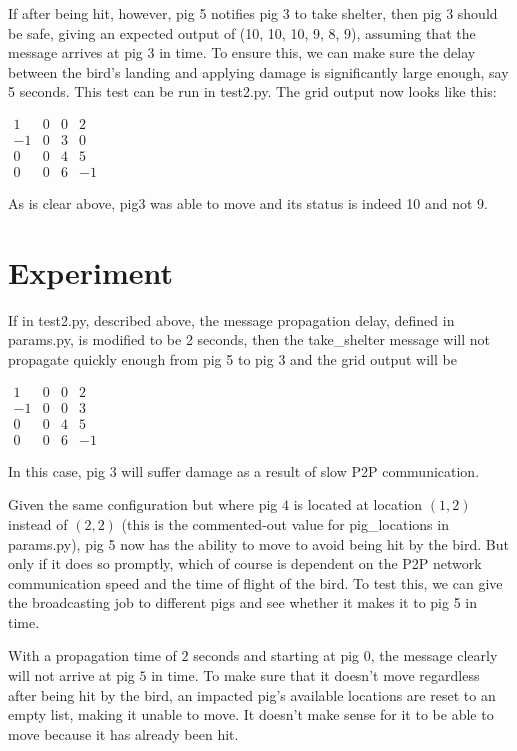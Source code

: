 \documentclass[]{article}
\begin{document}
If after being hit, however, pig 5 notifies pig 3 to take shelter, then pig 3 should be safe, giving an expected output of (10, 10, 10, 9, 8, 9), assuming that the message arrives at pig 3 in time. To ensure this, we can make sure the delay between the bird's landing and applying damage is significantly large enough, say 5 seconds. This test can be run in test2.py. The grid output now looks like this:
 
$\begin{array}{cccc}
1 & 0 & 0 & 2 \\
-1 & 0 & 3 & 0 \\
0 & 0 & 4 & 5 \\
0 & 0 & 6 & -1
\end{array}$
 
As is clear above, pig3 was able to move and its status is indeed 10 and not 9.

\section{Experiment}

If in test2.py, described above, the message propagation delay, defined in params.py, is modified to be 2 seconds, then the take\_shelter message will not propagate quickly enough from pig 5 to pig 3 and the grid output will be 

$\begin{array}{cccc}
1 & 0 & 0 & 2 \\
-1 & 0 & 0 & 3 \\
0 & 0 & 4 & 5 \\
0 & 0 & 6 & -1
\end{array}$
 
In this case, pig $3$ will suffer damage as a result of slow P2P communication.

Given the same configuration but where pig $4$ is located at location $(1,2)$ instead of $(2,2)$ (this is the commented-out value for pig\_locations in params.py), pig 5 now has the ability to move to avoid being hit by the bird. But only if it does so promptly, which of course is dependent on the P2P network communication speed and the time of flight of the bird. To test this, we can give the broadcasting job to different pigs and see whether it makes it to pig 5 in time.

With a propagation time of $2$ seconds and starting at pig $0$, the message clearly will not arrive at pig $5$ in time. To make sure that it doesn't move regardless after being hit by the bird, an impacted pig's available locations are reset to an empty list, making it unable to move. It doesn't make sense for it to be able to move because it has already been hit.
\end{document}
